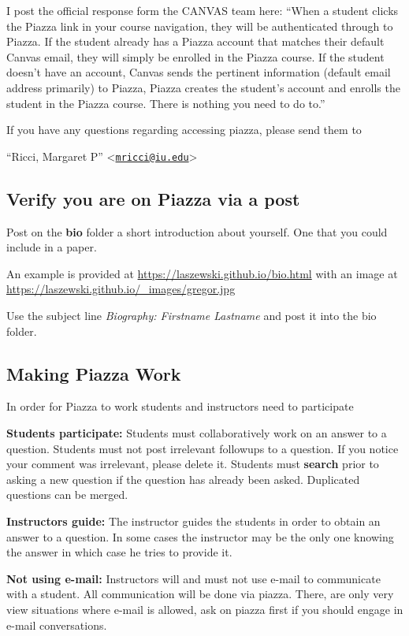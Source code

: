 I post the official response form the CANVAS team here:
``When a student clicks the Piazza link in your course navigation, they
will be authenticated through to Piazza. If the student already has a
Piazza account that matches their default Canvas email, they will simply
be enrolled in the Piazza course. If the student doesn't have an
account, Canvas sends the pertinent information (default email address
primarily) to Piazza, Piazza creates the student's account and enrolls
the student in the Piazza course. There is nothing you need to do to.''

If you have any questions regarding accessing piazza, please send them
to

``Ricci, Margaret P''
\textless{}\href{mailto:mricci@iu.edu}{\nolinkurl{mricci@iu.edu}}\textgreater{}

\subsection{Verify you are on Piazza via a post}

Post on the \textbf{bio} folder a short introduction about yourself. One
that you could include in a paper.

An example is provided at \url{https://laszewski.github.io/bio.html}
with an image at \url{https://laszewski.github.io/_images/gregor.jpg}

Use the subject line \emph{Biography: Firstname Lastname} and post it
into the bio folder.

\subsection{Making Piazza Work}

In order for Piazza to work students and instructors need to participate

\textbf{Students participate:} Students must collaboratively work on an
answer to a question. Students must not post irrelevant followups to a
question. If you notice your comment was irrelevant, please delete it.
Students must \textbf{search} prior to asking a new question if the
question has already been asked. Duplicated questions can be merged.

\textbf{Instructors guide:} The instructor guides the students in order
to obtain an answer to a question. In some cases the instructor may be
the only one knowing the answer in which case he tries to provide it.

\textbf{Not using e-mail:} Instructors will and must not use e-mail to
communicate with a student. All communication will be done via piazza.
There, are only very view situations where e-mail is allowed, ask on
piazza first if you should engage in e-mail conversations.

